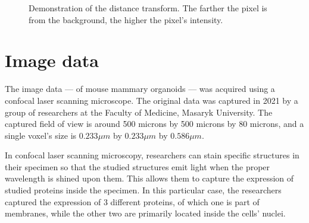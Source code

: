 \documentclass[
  digital,     %
  oneside,     %
  nosansbold,  %
  nocolorbold, %
  lof,         %
  lot,         %
]{fithesis4}
\begin{document}
\begin{figure}
\begin{subfigure}[t]{0.48\textwidth}
    \end{subfigure}
    \caption{Demonstration of the distance transform. The farther the pixel is
    from the background, the higher the pixel's intensity.}
    \label{fig:demonstration-distance-map}
\end{figure}

\clearpage

\chapter{Image data}

The image data --- of mouse mammary organoids --- was acquired using a confocal
laser scanning microscope. The original data was captured in 2021 by a group of
researchers at the Faculty of Medicine, Masaryk University. The captured field of view is around 500
microns by 500 microns by 80 microns, and a single voxel's size is $0.233\mu m$ by
$0.233\mu m$ by $0.586\mu m$.

In confocal laser scanning microscopy, researchers can stain specific structures in
their specimen so that the studied structures emit light when the proper wavelength
is shined upon them. This allows them to capture the expression of studied proteins
inside the specimen. In this particular case, the researchers captured the
expression of 3 different proteins, of which one is part of membranes, while the
other two are primarily located inside the cells' nuclei.
\end{document}
